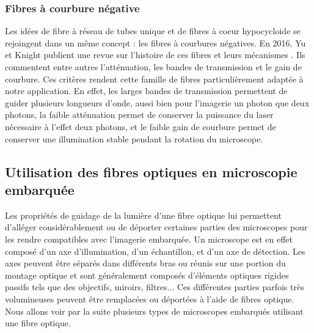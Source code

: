\subsubsection{Fibres à courbure négative}

Les idées de fibre à réseau de tubes unique et de fibres à coeur hypocycloide se rejoingent dans un même concept : les fibres à courbures négatives. En 2016, Yu et Knight publient une revue sur l'histoire de ces fibres et leurs mécanismes \cite{yu_negative_2016}. Ils commentent entre autres l'atténuation, les bandes de transmission et le gain de courbure. Ces critères rendent cette famille de fibres particulièrement adaptée à notre application. En effet, les larges bandes de transmission permettent de guider plusieurs longueurs d'onde, aussi bien pour l'imagerie un photon que deux photons, la faible atténuation permet de conserver la puissance du laser nécessaire à l'effet deux photons, et le faible gain de courbure permet de conserver une illumination stable pendant la rotation du microscope.




\subsection{Utilisation des fibres optiques en microscopie embarquée}


Les propriétés de guidage de la lumière d'une fibre optique lui permettent d'alléger considérablement ou de déporter certaines parties des microscopes pour les rendre compatibles avec l'imagerie embarquée. Un microscope est en effet composé d'un axe d'illumination, d'un échantillon, et d'un axe de détection. Les axes peuvent être séparés dans différents bras ou réunis sur une portion du montage optique et sont généralement composés d'éléments optiques rigides passifs tels que des objectifs, miroirs, filtres... Ces différentes parties parfois très volumineuses peuvent être remplacées ou déportées à l'aide de fibres optique. Nous allons voir par la suite plusieurs types de microscopes embarqués utilisant une fibre optique.

